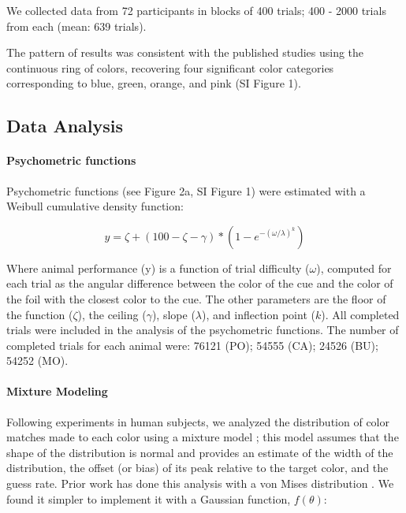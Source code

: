 \documentclass[9pt,biorxiv,lineno,onehalfspacing]{lapreprint}
\begin{document}
\begin{refsection}
We collected data from 72 participants in blocks of 400 trials; 400 - 2000 trials from each (mean: 639 trials).

The pattern of results was consistent with the published studies using the continuous ring of colors, recovering four significant color categories corresponding to blue, green, orange, and pink (SI Figure 1). 

\subsection{Data Analysis}

\paragraph{Psychometric functions}

Psychometric functions (see Figure 2a, SI Figure 1) were estimated with a Weibull cumulative density function: %

\begin{equation} \label{eq:Weibull}
    y=\zeta+(100-\zeta-\gamma) *\left(1-e^{-(\omega / \lambda)^k}\right) 
\end{equation}

Where animal performance (y) is a function of trial difficulty ($\omega$), computed for each trial as the angular difference between the color of the cue and the color of the foil with the closest color to the cue. 
The other parameters are the floor of the function ($\zeta$), the ceiling ($\gamma$), slope ($\lambda$), and inflection point ($k$). 
All completed trials were included in the analysis of the psychometric functions. 
The number of completed trials for each animal were: 76121 (PO); 54555 (CA); 24526 (BU); 54252 (MO). 

\paragraph{Mixture Modeling}\label{para:MixtureModeling}

Following experiments in human subjects, we analyzed the distribution of color matches made to each color using a mixture model \citep{zhang_discrete_2008,bae_why_2015}; this model assumes that the shape of the distribution is normal and provides an estimate of the width of the distribution, the offset (or bias) of its peak relative to the target color, and the guess rate.
Prior work has done this analysis with a von Mises distribution \citep{zhang_discrete_2008,bae_why_2015}.
We found it simpler to implement it with a Gaussian function, $f(\theta)$:


\end{refsection}
\end{document}
